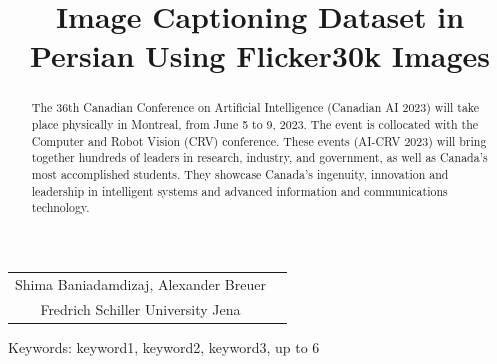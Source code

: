 \documentclass[10pt]{cai}
\begin{document}
\begin{center}

  \title{Image Captioning Dataset in Persian Using Flicker30k Images}
  \maketitle

  \thispagestyle{empty}

  \begin{tabular}{cc}
    Shima Baniadamdizaj\upstairs{\affilone}, Alexander Breuer\upstairs{\affilone}
   \\[0.25ex]
   {\small \upstairs{\affilone} Fredrich Schiller University Jena} \\
  \end{tabular}
  
  \vspace*{0.2in}
\end{center}

\begin{abstract}

The 36th Canadian Conference on Artificial Intelligence (Canadian AI 2023) will take place physically in Montreal, from June 5 to 9, 2023. The event is collocated with the Computer and Robot Vision (CRV) conference. These events (AI-CRV 2023) will bring together hundreds of leaders in research, industry, and government, as well as Canada's most accomplished students. They showcase Canada's ingenuity, innovation and leadership in intelligent systems and advanced information and communications technology.\\
\end{abstract}

\begin{keywords}{Keywords:}
keyword1, keyword2, keyword3, up to 6
\end{keywords}
\copyrightnotice
\end{document}
